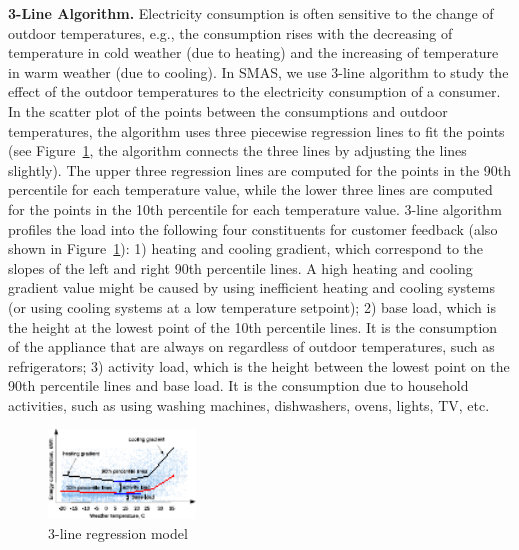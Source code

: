 \documentclass{sig-alternate}
\newcommand{\eg}{e.g.}
\begin{document}
{\bf 3-Line Algorithm.} Electricity consumption is often sensitive to the change of outdoor temperatures, \eg, the consumption rises with the decreasing of temperature in cold weather (due to heating) and the increasing of temperature in warm weather (due to cooling).  In SMAS, we use 3-line algorithm \cite{birt} to study the effect of the outdoor temperatures to the electricity consumption of a consumer. In the scatter plot of the points between the consumptions and  outdoor temperatures, the algorithm uses three piecewise regression lines to fit the points  (see Figure~\ref{fig:threelmodel}, the algorithm connects the three lines by adjusting the lines slightly). The upper three regression lines are computed for the points in the 90th percentile for each temperature value, while the lower three lines are computed for the points in the 10th percentile  for each temperature value. 3-line algorithm  profiles the load into the following four constituents for customer feedback  (also shown in  Figure~\ref{fig:threelmodel}): 1) heating and cooling gradient, which correspond to the slopes of the left and right 90th percentile lines. A high heating and cooling gradient value might be caused by using inefficient heating and  cooling systems (or using cooling systems at a low temperature setpoint); 2) base load, which is the height at the lowest point of the 10th percentile lines. It is the consumption of the appliance that are always on regardless of outdoor temperatures, such as refrigerators; 3) activity load, which is the height between the lowest point on the 90th percentile lines and base load. It is the consumption due to household activities, such as using  washing machines, dishwashers, ovens, lights, TV, etc. 
\begin{figure}[htp]
\centering
\includegraphics[width=0.35\textwidth]{images/threelmodel}
\vspace{-8pt}
\caption{3-line regression model}
\label{fig:threelmodel}
\vspace{-10pt}
\end{figure}
\end{document}
